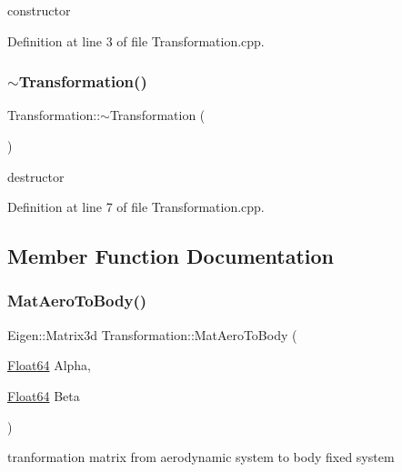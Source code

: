 constructor 



Definition at line 3 of file Transformation.\+cpp.

\mbox{\label{class_transformation_ade11a9f133b2acd81ae9383187cc255e}} 
\subsubsection{\texorpdfstring{$\sim$\+Transformation()}{~Transformation()}}
{\footnotesize\ttfamily Transformation\+::$\sim$\+Transformation (\begin{DoxyParamCaption}{ }\end{DoxyParamCaption})}



destructor 



Definition at line 7 of file Transformation.\+cpp.



\subsection{Member Function Documentation}
\mbox{\label{class_transformation_a9a1ea1611b6e3403ef1f522caf332226}} 
\subsubsection{\texorpdfstring{Mat\+Aero\+To\+Body()}{MatAeroToBody()}}
{\footnotesize\ttfamily Eigen\+::\+Matrix3d Transformation\+::\+Mat\+Aero\+To\+Body (\begin{DoxyParamCaption}\item[{\hyperlink{group___tools_ga3f1431cb9f76da10f59246d1d743dc2c}{Float64}}]{Alpha,  }\item[{\hyperlink{group___tools_ga3f1431cb9f76da10f59246d1d743dc2c}{Float64}}]{Beta }\end{DoxyParamCaption})}



tranformation matrix from aerodynamic system to body fixed system 


